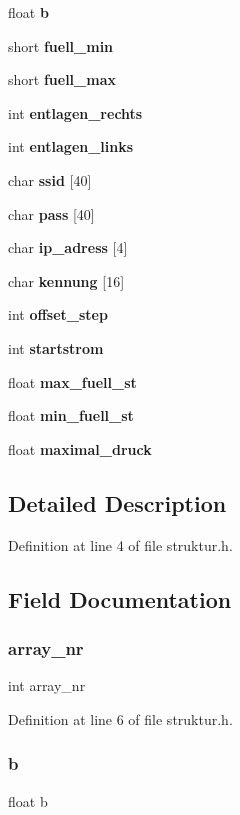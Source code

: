 \begin{DoxyCompactItemize}
float \textbf{ b}
\item 
short \textbf{ fuell\+\_\+min}
\item 
short \textbf{ fuell\+\_\+max}
\item 
int \textbf{ entlagen\+\_\+rechts}
\item 
int \textbf{ entlagen\+\_\+links}
\item 
char \textbf{ ssid} [40]
\item 
char \textbf{ pass} [40]
\item 
char \textbf{ ip\+\_\+adress} [4]
\item 
char \textbf{ kennung} [16]
\item 
int \textbf{ offset\+\_\+step}
\item 
int \textbf{ startstrom}
\item 
float \textbf{ max\+\_\+fuell\+\_\+st}
\item 
float \textbf{ min\+\_\+fuell\+\_\+st}
\item 
float \textbf{ maximal\+\_\+druck}
\end{DoxyCompactItemize}


\subsection{Detailed Description}


Definition at line 4 of file struktur.\+h.



\subsection{Field Documentation}
\mbox{\label{structramp1_a773d0c88abc27506463f4e6404fa4bfd}} 
\subsubsection{array\+\_\+nr}
{\footnotesize\ttfamily int array\+\_\+nr}



Definition at line 6 of file struktur.\+h.

\mbox{\label{structramp1_a83fc1af92e29717b4513d121b0c72c7d}} 
\subsubsection{b}
{\footnotesize\ttfamily float b}



